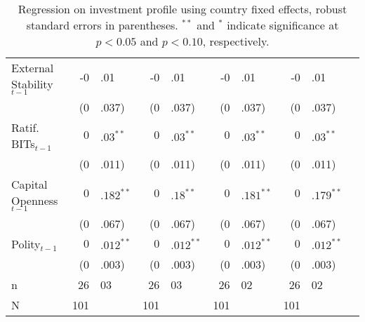 \begin{enumerate}
\begin{itemize}
\begin{table}[ht]
\begin{tabular}{lr@{}lr@{}lr@{}lr@{}lr@{}}
			  External Stability$_{t-1}$ & -0&.01 & -0&.01 & -0&.01 & -0&.01 \\ 
			   & (0&.037) & (0&.037) & (0&.037) & (0&.037) \\ 
			  Ratif. BITs$_{t-1}$ & $0$&$.03^{\ast\ast}$ & $0$&$.03^{\ast\ast}$ & $0$&$.03^{\ast\ast}$ & $0$&$.03^{\ast\ast}$ \\ 
			   & (0&.011) & (0&.011) & (0&.011) & (0&.011) \\ 
			  Capital Openness$_{t-1}$ & $0$&$.182^{\ast\ast}$ & $0$&$.18^{\ast\ast}$ & $0$&$.181^{\ast\ast}$ & $0$&$.179^{\ast\ast}$ \\ 
			   & (0&.067) & (0&.067) & (0&.067) & (0&.067) \\ 
			  Polity$_{t-1}$ & $0$&$.012^{\ast\ast}$ & $0$&$.012^{\ast\ast}$ & $0$&$.012^{\ast\ast}$ & $0$&$.012^{\ast\ast}$ \\ 
			   & (0&.003) & (0&.003) & (0&.003) & (0&.003) \\ 
			   \hline
			n & 26&03 & 26&03 & 26&02 & 26&02 \\ 
			  N & 101 && 101 && 101 && 101 \\ 
			   \hline
			\hline
			\end{tabular}
			\endgroup
			\caption{Regression on investment profile using country fixed effects, robust standard errors in parentheses. $^{**}$ and $^{*}$ indicate significance at $p< 0.05 $ and $p< 0.10 $, respectively.} 
			\end{table}
			\FloatBarrier		


\end{itemize}
\end{enumerate}
